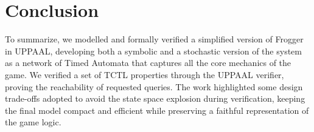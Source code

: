 \documentclass[a4paper]{article}
\begin{document}
\newpage
\section{Conclusion}
To summarize, we modelled and formally verified a simplified version of 
Frogger in UPPAAL, developing both a symbolic and a stochastic version of the 
system as a network of Timed Automata that captures all the core mechanics of 
the game. We verified a set of TCTL properties through the UPPAAL verifier, proving 
the reachability of requested queries. 
The work highlighted some design trade-offs adopted to avoid 
the state space explosion during verification, keeping the final model compact 
and efficient while preserving a faithful representation of the game logic.
\end{document}
